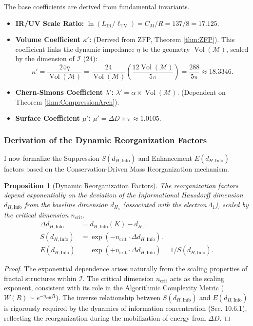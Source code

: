 \documentclass[11pt, a4paper]{article}
\newtheorem{proposition}[theorem]{Proposition}
\theoremstyle{definition}
\theoremstyle{definition}
\newcommand{\M}{\mathcal{M}}
\newcommand{\Ical}{\mathcal{I}}
\newcommand{\Vol}{\operatorname{Vol}}
\newcommand{\LIR}{L_{\mathrm{IR}}}
\newcommand{\lUV}{\ell_{\mathrm{UV}}}
\newcommand{\Veight}{\Vol(\M)}
\newcommand{\dHInfo}{d_{H,\mathrm{Info}}} %
\newcommand{\ncrit}{n_{\mathrm{crit}}}
\begin{document}
The base coefficients are derived from fundamental invariants.

\begin{itemize}
    \item \textbf{IR/UV Scale Ratio:} $\ln(\LIR/\lUV) = C_M/R = 137/8 = 17.125$.
    \item \textbf{Volume Coefficient $\kappa'$:} (Derived from ZFP, Theorem \ref{thm:ZFP}). This coefficient links the dynamic impedance $\eta$ to the geometry $\Veight$, scaled by the dimension of $\Ical$ (24):
    \[ \kappa' = \frac{24 \eta}{\Veight} = \frac{24}{\Veight} \left(\frac{12 \Veight}{5\pi}\right) = \frac{288}{5\pi} \approx 18.3346. \]
    \item \textbf{Chern-Simons Coefficient $\lambda'$:} $\lambda' = \alpha \times \Veight$. (Dependent on Theorem \ref{thm:CompressionArch}).
    \item \textbf{Surface Coefficient $\mu'$:} $\mu' = \Delta D \times \pi \approx 1.0105$.
\end{itemize}

\subsubsection{Derivation of the Dynamic Reorganization Factors}

I now formalize the Suppression $S(\dHInfo)$ and Enhancement $E(\dHInfo)$ factors based on the Conservation-Driven Mass Reorganization mechanism.

\begin{proposition}[Dynamic Reorganization Factors]\label{prop:reorganization_factors}
The reorganization factors depend exponentially on the deviation of the Informational Hausdorff dimension $\dHInfo$ from the baseline dimension $d_{H_{0}}$ (associated with the electron $4_1$), scaled by the critical dimension $\ncrit$.
\begin{align}
    \Delta \dHInfo &= \dHInfo(K) - d_{H_{0}}. \\
    S(\dHInfo) &= \exp(-\ncrit \cdot \Delta \dHInfo). \\
    E(\dHInfo) &= \exp(+\ncrit \cdot \Delta \dHInfo) = 1/S(\dHInfo).
\end{align}
\end{proposition}
\begin{proof}
The exponential dependence arises naturally from the scaling properties of fractal structures within $\Ical$. The critical dimension $\ncrit$ acts as the scaling exponent, consistent with its role in the Algorithmic Complexity Metric ($W(R) \sim e^{-\ncrit R}$). The inverse relationship between $S(\dHInfo)$ and $E(\dHInfo)$ is rigorously required by the dynamics of information concentration (Sec. 10.6.1), reflecting the reorganization during the mobilization of energy from $\Delta D$.
\end{proof}
\end{document}
